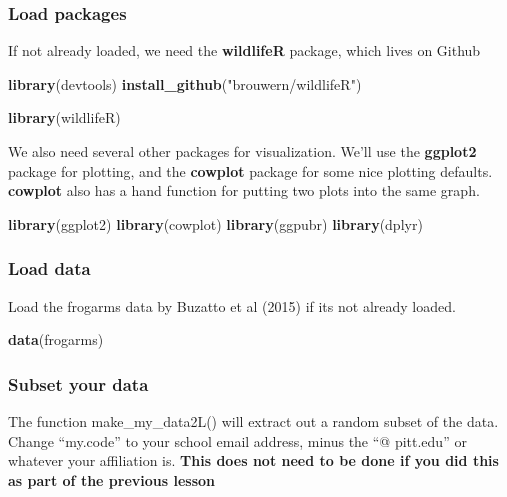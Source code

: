 \documentclass[]{book}
\newenvironment{Shaded}{\begin{snugshade}}{\end{snugshade}}
\newcommand{\KeywordTok}[1]{\textcolor[rgb]{0.13,0.29,0.53}{\textbf{#1}}}
\newcommand{\StringTok}[1]{\textcolor[rgb]{0.31,0.60,0.02}{#1}}
\newcommand{\NormalTok}[1]{#1}
\theoremstyle{definition}
\theoremstyle{definition}
\theoremstyle{definition}
\theoremstyle{remark}
\begin{document}
\subsubsection{Load packages}\label{load-packages-1}

If not already loaded, we need the \textbf{wildlifeR} package, which
lives on Github

\begin{Shaded}
\begin{Highlighting}[]
\KeywordTok{library}\NormalTok{(devtools)}
\KeywordTok{install_github}\NormalTok{(}\StringTok{"brouwern/wildlifeR"}\NormalTok{)}

\KeywordTok{library}\NormalTok{(wildlifeR)}
\end{Highlighting}
\end{Shaded}

We also need several other packages for visualization. We'll use the
\textbf{ggplot2} package for plotting, and the \textbf{cowplot} package
for some nice plotting defaults. \textbf{cowplot} also has a hand
function for putting two plots into the same graph.

\begin{Shaded}
\begin{Highlighting}[]
\KeywordTok{library}\NormalTok{(ggplot2)}
\KeywordTok{library}\NormalTok{(cowplot)}
\KeywordTok{library}\NormalTok{(ggpubr)}
\KeywordTok{library}\NormalTok{(dplyr)}
\end{Highlighting}
\end{Shaded}

\subsubsection{Load data}\label{load-data-1}

Load the frogarms data by Buzatto et al (2015) if its not already
loaded.

\begin{Shaded}
\begin{Highlighting}[]
\KeywordTok{data}\NormalTok{(frogarms)}
\end{Highlighting}
\end{Shaded}

\subsubsection{Subset your data}\label{subset-your-data-1}

The function make\_my\_data2L() will extract out a random subset of the
data. Change ``my.code'' to your school email address, minus the ``@
pitt.edu'' or whatever your affiliation is. \textbf{This does not need
to be done if you did this as part of the previous lesson}
\end{document}
